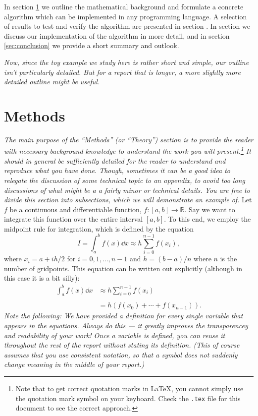 \documentclass[english,notitlepage,reprint,nofootinbib]{revtex4-1}  %
\begin{document}
In section \ref{sec:methods} we outline the mathematical background and formulate a concrete algorithm which can be implemented in any programming language. A selection of results to test and verify the algorithm are presented in section \label{sec:results}. In section \label{sec:discussion} we discuss our implementation of the algorithm in more detail, and in section \ref{sec:conclusion} we provide a short summary and outlook.

\textit{Now, since the toy example we study here is rather short and simple, our outline isn't particularly detailed. But for a report that is longer, a more slightly more detailed outline might be useful.}


\section{Methods}\label{sec:methods}
%
\textit{The main purpose of the ``Methods'' (or ``Theory'') section is to provide the reader with necessary background knowledge to understand the work you will present.\footnote{Note that to get correct quotation marks in LaTeX, you cannot simply use the quotation mark symbol on your keyboard. Check the \texttt{.tex} file for this document to see the correct approach.} It should in general be sufficiently detailed for the reader to understand and reproduce what you have done. Though, sometimes it can be a good idea to relegate the discussion of some technical topic to an appendix, to avoid too long discussions of what might be a a fairly minor or technical details.  You are free to divide this section into subsections, which we will demonstrate an example of.}
%
Let $f$ be a continuous and differentiable function, $f: [a,b] \to \mathbb{R}$. Say we want to integrate this function over the entire interval $[a,b]$. To this end, we employ the midpoint rule for integration, which is defined by the equation~\cite{midpoint_rule}
%
\begin{equation}
    I = \int_a^b f(x)\dd x \approx h\sum_{i=0}^{n-1} f(x_i), 
\end{equation}
where $x_i = a + ih/2$ for $i = 0, 1, ..., n-1$ and $h = (b-a)/n$ where $n$ is the number of gridpoints. This equation can be written out explicitly (although in this case it is a bit silly):
%
\begin{equation}
    \begin{split}
        \int_a^b f(x)\dd x & \approx h \sum_{i=0}^{n-1} f(x_i) \\
                                    \\
                                    & = h\left(f(x_0) + \cdots + f(x_{n-1})\right).
    \end{split}
\end{equation}
%
\textit{Note the following: We have provided a definition for every single variable that appears in the equations. Always do this --- it greatly improves the transparencey and readability of your work! Once a variable is defined, you can reuse it throughout the rest of the report without stating its definition. (This of course assumes that you use consistent notation, so that a symbol does not suddenly change meaning in the middle of your report.)}
\end{document}
